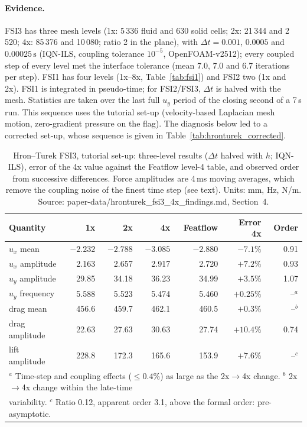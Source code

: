 \paragraph{Evidence.}
FSI3 has three mesh levels (1x: 5\,336 fluid and 630 solid cells; 2x: 21\,344 and 2\,520; 4x: 85\,376 and 10\,080; ratio 2 in the plane), with $\Delta t = 0.001$, $0.0005$ and $0.00025\,\mathrm{s}$ (IQN-ILS, coupling tolerance $10^{-5}$, OpenFOAM-v2512); every coupled step of every level met the interface tolerance (mean 7.0, 7.0 and 6.7 iterations per step).
FSI1 has four levels (1x--8x, Table~\ref{tab:fsi1}) and FSI2 two (1x and 2x). FSI1 is integrated in pseudo-time; for FSI2/FSI3, $\Delta t$ is halved with the mesh.
Statistics are taken over the last full $u_y$ period of the closing second of a 7\,s run.
This sequence uses the tutorial set-up (velocity-based Laplacian mesh motion, zero-gradient pressure on the flag). The diagnosis below led to a corrected set-up, whose sequence is given in Table~\ref{tab:hronturek_corrected}.

\begin{table}[htbp]
	\centering
	\small
	\setlength{\tabcolsep}{4pt}
	\caption{Hron--Turek FSI3, tutorial set-up: three-level results ($\Delta t$ halved with $h$; IQN-ILS), error of the 4x value against the Featflow level-4 table, and observed order from successive differences. Force amplitudes are 4\,ms moving averages, which remove the coupling noise of the finest time step (see text). Units: mm, Hz, N/m. Source: paper-data/hronturek\_fsi3\_4x\_findings.md, Section~4.}
	\label{tab:hronturek}
	\begin{tabular}{lrrrrrr}
		\toprule
		Quantity & 1x & 2x & 4x & Featflow & Error 4x & Order \\
		\midrule
		$u_x$ mean & $-2.232$ & $-2.788$ & $-3.085$ & $-2.880$ & $-7.1\%$ & 0.91 \\
		$u_x$ amplitude & 2.163 & 2.657 & 2.917 & 2.720 & $+7.2\%$ & 0.93 \\
		$u_y$ amplitude & 29.85 & 34.18 & 36.23 & 34.99 & $+3.5\%$ & 1.07 \\
		$u_y$ frequency & 5.588 & 5.523 & 5.474 & 5.460 & $+0.25\%$ & --$^a$ \\
		drag mean & 456.6 & 459.7 & 462.1 & 460.5 & $+0.3\%$ & --$^b$ \\
		drag amplitude & 22.63 & 27.63 & 30.63 & 27.74 & $+10.4\%$ & 0.74 \\
		lift amplitude & 228.8 & 172.3 & 165.6 & 153.9 & $+7.6\%$ & --$^c$ \\
		\bottomrule
		\multicolumn{7}{l}{\footnotesize $^a$ Time-step and coupling effects ($\leq0.4\%$) as large as the 2x$\to$4x change. $^b$ 2x$\to$4x change within the late-time} \\
		\multicolumn{7}{l}{\footnotesize variability. $^c$ Ratio 0.12, apparent order 3.1, above the formal order: pre-asymptotic.}
	\end{tabular}
\end{table}

